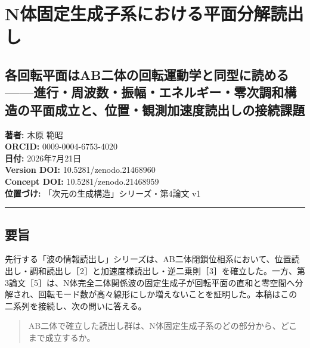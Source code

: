 \documentclass[
  a4paper,
]{ltjsarticle}
\author{}
\date{}
\begin{document}
\section{N体固定生成子系における平面分解読出し}\label{nux4f53ux56faux5b9aux751fux6210ux5b50ux7cfbux306bux304aux3051ux308bux5e73ux9762ux5206ux89e3ux8aadux51faux3057}

\subsection{各回転平面はAB二体の回転運動学と同型に読める------進行・周波数・振幅・エネルギー・零次調和構造の平面成立と、位置・観測加速度読出しの接続課題}\label{ux5404ux56deux8ee2ux5e73ux9762ux306fabux4e8cux4f53ux306eux56deux8ee2ux904bux52d5ux5b66ux3068ux540cux578bux306bux8aadux3081ux308bux9032ux884cux5468ux6ce2ux6570ux632fux5e45ux30a8ux30cdux30ebux30aeux30fcux96f6ux6b21ux8abfux548cux69cbux9020ux306eux5e73ux9762ux6210ux7acbux3068ux4f4dux7f6eux89b3ux6e2cux52a0ux901fux5ea6ux8aadux51faux3057ux306eux63a5ux7d9aux8ab2ux984c}

\textbf{著者:} 木原 範昭\\
\textbf{ORCID:} 0009-0004-6753-4020\\
\textbf{日付:} 2026年7月21日\\
\textbf{Version DOI:} 10.5281/zenodo.21468960\\
\textbf{Concept DOI:} 10.5281/zenodo.21468959\\
\textbf{位置づけ:} 「次元の生成構造」シリーズ・第4論文 v1

\begin{center}\rule{0.5\linewidth}{0.5pt}\end{center}

\subsection{要旨}\label{ux8981ux65e8}

先行する「波の情報読出し」シリーズは、AB二体閉鎖位相系において、位置読出し・調和読出し［2］と加速度様読出し・逆二乗則［3］を確立した。一方、第3論文［5］は、N体完全二体関係波の固定生成子が回転平面の直和と零空間へ分解され、回転モード数が高々線形にしか増えないことを証明した。本稿はこの二系列を接続し、次の問いに答える。

\begin{quote}
AB二体で確立した読出し群は、N体固定生成子系のどの部分から、どこまで成立するか。
\end{quote}
\end{document}
